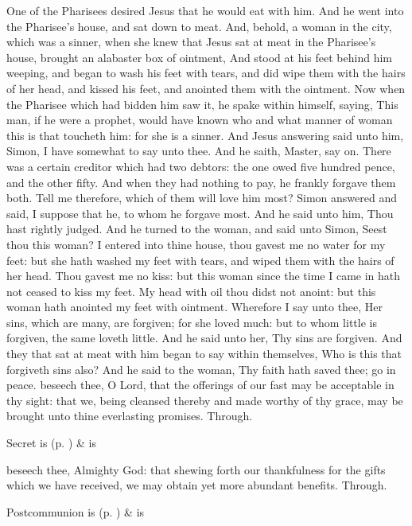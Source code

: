  One of the Pharisees desired Jesus that he would eat with him. And he went into the Pharisee's house, and sat down to meat. And, behold, a woman in the city, which was a sinner, when she knew that Jesus sat at meat in the Pharisee's house, brought an alabaster box of ointment, And stood at his feet behind him weeping, and began to wash his feet with tears, and did wipe them with the hairs of her head, and kissed his feet, and anointed them with the ointment. Now when the Pharisee which had bidden him saw it, he spake within himself, saying, This man, if he were a prophet, would have known who and what manner of woman this is that toucheth him: for she is a sinner. And Jesus answering said unto him, Simon, I have somewhat to say unto thee. And he saith, Master, say on. There was a certain creditor which had two debtors: the one owed five hundred pence, and the other fifty. And when they had nothing to pay, he frankly forgave them both. Tell me therefore, which of them will love him most? Simon answered and said, I suppose that he, to whom he forgave most. And he said unto him, Thou hast rightly judged. And he turned to the woman, and said unto Simon, Seest thou this woman? I entered into thine house, thou gavest me no water for my feet: but she hath washed my feet with tears, and wiped them with the hairs of her head. Thou gavest me no kiss: but this woman since the time I came in hath not ceased to kiss my feet. My head with oil thou didst not anoint: but this woman hath anointed my feet with ointment. Wherefore I say unto thee, Her sins, which are many, are forgiven; for she loved much: but to whom little is forgiven, the same loveth little. And he said unto her, Thy sins are forgiven. And they that sat at meat with him began to say within themselves, Who is this that forgiveth sins also? And he said to the woman, Thy faith hath saved thee; go in peace.
\secret
{} beseech thee, O Lord, that the offerings of our fast may be acceptable in thy sight: that we, being cleansed thereby and made worthy of thy grace, may be brought unto thine everlasting promises. Through.
\begin{rubric}
     Secret is  (p. \pageref{SPSaints}) \&  is 
\end{rubric}

\postcommunion
{} beseech thee, Almighty God: that shewing forth our thankfulness for the gifts which we have received, we may obtain yet more abundant benefits. Through.
\begin{rubric}
     Postcommunion is  (p. \pageref{SPSaints}) \&  is 
\end{rubric}


